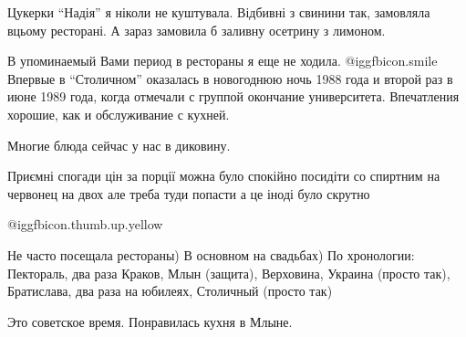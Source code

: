  
 
 
 
 
\zzSecCmt

\begin{itemize} %

Цукерки \enquote{Надія} я ніколи не куштувала. Відбивні з свинини так, замовляла вцьому
ресторані. А зараз замовила б заливну осетрину з лимоном.



В упоминаемый Вами период в рестораны я еще не ходила. @igg{fbicon.smile} Впервые в \enquote{Столичном}
оказалась в новогоднюю ночь 1988 года и второй раз в июне 1989 года, когда
отмечали с группой окончание университета. Впечатления хорошие, как и
обслуживание с кухней.


Многие блюда сейчас у нас в диковину.


Приємні спогади цін за порції можна було спокійно посидіти со спиртним на
червонец на двох але треба туди попасти а це іноді було скрутно

 @igg{fbicon.thumb.up.yellow} 


Не часто посещала рестораны) В основном на свадьбах) По хронологии: Пектораль,
два раза Краков, Млын (защита), Верховина, Украина (просто так), Братислава,
два раза на юбилеях, Столичный (просто так)

Это советское время. Понравилась кухня в Млыне.

\end{itemize} %
